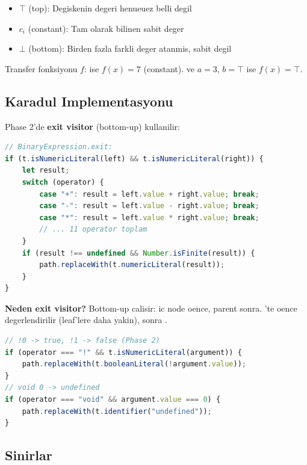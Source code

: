 \begin{itemize}
\item $\top$ (top): Degiskenin degeri henueuez belli degil
\item $c_i$ (constant): Tam olarak bilinen sabit deger
\item $\bot$ (bottom): Birden fazla farkli deger atanmis, sabit degil
\end{itemize}

Transfer fonksiyonu $f$:  ise $f(x) = 7$ (constant).  ve $a = 3$, $b = \top$ ise $f(x) = \top$.

\subsection{Karadul Implementasyonu}

 Phase 2'de \textbf{exit visitor} (bottom-up) kullanilir:

\begin{lstlisting}[language=JavaScript]
// BinaryExpression.exit:
if (t.isNumericLiteral(left) && t.isNumericLiteral(right)) {
    let result;
    switch (operator) {
        case "+": result = left.value + right.value; break;
        case "-": result = left.value - right.value; break;
        case "*": result = left.value * right.value; break;
        // ... 11 operator toplam
    }
    if (result !== undefined && Number.isFinite(result)) {
        path.replaceWith(t.numericLiteral(result));
    }
}
\end{lstlisting}

\textbf{Neden exit visitor?} Bottom-up calisir: ic node oence, parent sonra. 'te oence \code{*} degerlendirilir (leaf'lere daha yakin), sonra \code{+}.

\begin{example}
\begin{lstlisting}[language=JavaScript]
// !0 -> true, !1 -> false (Phase 2)
if (operator === "!" && t.isNumericLiteral(argument)) {
    path.replaceWith(t.booleanLiteral(!argument.value));
}
// void 0 -> undefined
if (operator === "void" && argument.value === 0) {
    path.replaceWith(t.identifier("undefined"));
}
\end{lstlisting}
\end{example}

\subsection{Sinirlar}

